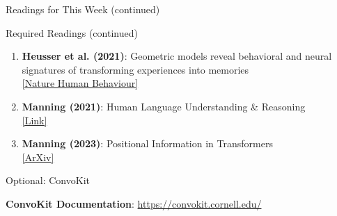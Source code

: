 \documentclass[aspectratio=169]{beamer}
\begin{document}
\begin{frame}{Readings for This Week (continued) 📖}
\small
    \begin{block}{Required Readings (continued)}
        \begin{enumerate}\setlength{\itemsep}{0pt}
            \setcounter{enumi}{5}
            \item \textbf{Heusser et al. (2021)}: Geometric models reveal behavioral and neural signatures of transforming experiences into memories \\
            \href{https://www.nature.com/articles/s41562-021-01051-6}{[Nature Human Behaviour]}

            \item \textbf{Manning (2021)}: Human Language Understanding \& Reasoning \\
            \href{https://www.cambridge.org/core/journals/natural-language-engineering}{[Link]}

            \item \textbf{Manning (2023)}: Positional Information in Transformers \\
            \href{https://arxiv.org/abs/2305.16642}{[ArXiv]}
        \end{enumerate}
    \end{block}

    \vspace{0.3cm}

    \begin{block}{Optional: ConvoKit}
        \item \textbf{ConvoKit Documentation}: \href{https://convokit.cornell.edu/}{https://convokit.cornell.edu/}
    \end{block}
\end{frame}
\end{document}

